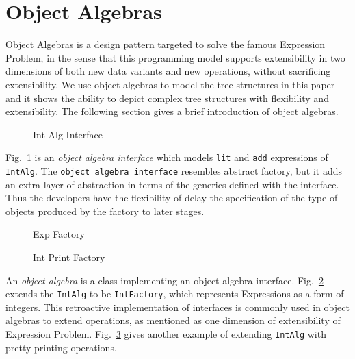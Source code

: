 \section{Object Algebras}\label{subsec:ObjectAlgebras}

Object Algebras is a design pattern targeted to solve the famous Expression Problem, in the sense that this programming model supports extensibility in two dimensions of both new data variants and new operations, without sacrificing extensibility. We use object algebras to model the tree structures in this paper and it shows the ability to depict complex tree structures with flexibility and extensibility. The following section gives a brief introduction of object algebras.

\begin{figure}[t]
\nocaptionrule
\caption{Int Alg Interface}
\label{int_alg_interface}
\end{figure}

Fig.~\ref{int_alg_interface} is an \emph{object algebra interface} which models \lstinline{lit} and \lstinline{add} expressions of \lstinline{IntAlg}. The \lstinline{object algebra interface} resembles abstract factory, but it adds an extra layer of abstraction in terms of the generics defined with the interface. Thus the developers have the flexibility of delay the specification of the type of objects produced by the factory to later stages.

\begin{figure}[t]
\nocaptionrule
\caption{Exp Factory}
\label{exp_factory}
\end{figure}

\begin{figure}[t]
\nocaptionrule
\caption{Int Print Factory}
\label{int_print_factory}
\end{figure}

An \emph{object algebra} is a class implementing an object algebra interface. Fig.~\ref{exp_factory} extends the \lstinline{IntAlg} to be \lstinline{IntFactory}, which represents Expressions as a form of integers. This retroactive implementation of interfaces is commonly used in object algebras to extend operations, as mentioned as one dimension of extensibility of Expression Problem. Fig.~\ref{int_print_factory} gives another example of extending \lstinline{IntAlg} with pretty printing operations.

